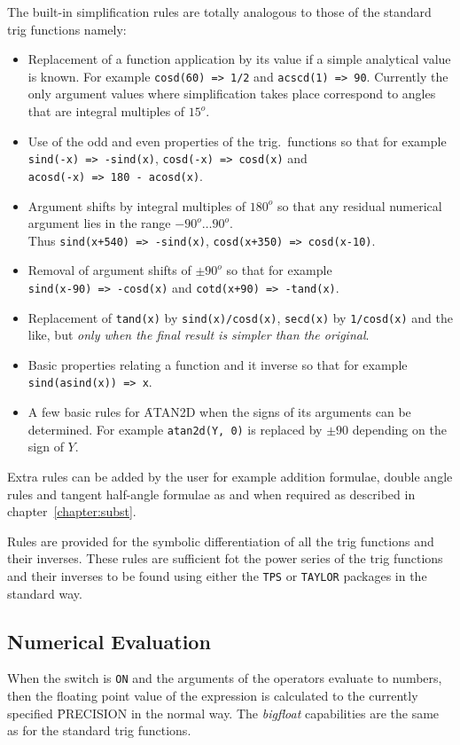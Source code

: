 The built-in simplification rules are totally analogous to those of the standard trig functions namely:
\begin{itemize}
\item  Replacement of a function application by its value if a simple analytical value is known. For example \texttt{cosd(60) => 1/2} and \texttt{acscd(1) => 90}. Currently the only argument values where simplification takes place correspond  to angles that are integral multiples of $15^o$.
\item Use of the odd and even properties of the trig.\ functions so that for example 
\texttt{sind(-x) => -sind(x)}, \texttt{cosd(-x) => cosd(x)}  and \\
\texttt{acosd(-x) => 180 - acosd(x)}. 
\item  Argument shifts by integral multiples of $180^o$ so that any residual numerical argument  lies in the range $-90^o \ldots  90^o$.  \\
Thus \texttt{sind(x+540) => -sind(x)}, \texttt{cosd(x+350) => cosd(x-10)}.
\item  Removal of argument shifts of $\pm 90^o$ so that for example \\
 \texttt{sind(x-90) => -cosd(x)} and  \texttt{cotd(x+90) => -tand(x)}.
\item Replacement of \texttt{tand(x)} by \texttt{sind(x)/cosd(x)}, \texttt{secd(x)} by \texttt{1/cosd(x)} and the like, but \emph{only when the final result is simpler than the original}.
\item Basic properties relating a function and it inverse so that for example \\
\texttt{sind(asind(x)) => x}.
\item A few basic rules for \f{ATAN2D} when the signs of its arguments can be determined. For example \texttt{atan2d(Y, 0)} is replaced by $\pm 90$ depending on the sign of $Y$.
\end{itemize}

Extra rules can be added by the user for example addition formulae, double  angle rules and tangent half-angle formulae as and when required as described in chapter~\ref{chapter:subst}.

Rules are provided for the symbolic differentiation of all the trig  functions and their inverses.  These rules are sufficient fot the power series of the trig functions and their inverses to be found using either the \texttt{TPS} or \texttt{TAYLOR} packages in the standard way.


\subsection{Numerical Evaluation}
When the switch  is \texttt{ON} and the arguments of the operators evaluate to numbers, then the floating point value of the expression is calculated to the currently specified \f{PRECISION} in the normal way.  The \textit{bigfloat} capabilities are  the same as for the standard trig functions.   

